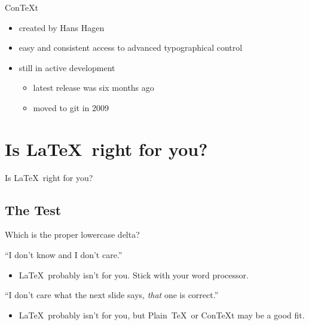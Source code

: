 \documentclass{beamer}                  %
\newcommand{\srule}{
	\rule{\textwidth}{1pt}\\
}
\newlength{\subsecwidth}
\newenvironment{slide}{
	\begin{frame} %
	\settowidth{\subsecwidth}{\insertsubsection} %
	\ifthenelse{\dimtest{\subsecwidth}{<}{1pt}}{ %
		\frametitle{\insertsection\\             %
		\vspace{-1ex}                            %
		\color{fore}\srule                       %
		\par                                     %
		\vspace{-3ex}                            %
		}
	}{                                           %
		\frametitle{\insertsection\ -- \insertsubsection\\ %
		\vspace{-1ex}                            %
		\color{fore}\srule                       %
		\par                                     %
		\vspace{-3ex}                            %
		}
	}
	\Large                                       %
}{
	\end{frame}
}
\newcommand{\titleslide}[1]{
	\section{#1}             %
	\begin{slide}
		\begin{center}
			\color{comments}
			\Huge            %
			#1               %
		\end{center}
	\end{slide}
}
\begin{document}
\begin{slide}
	Con\TeX t
	\begin{itemize}
		\item created by Hans Hagen
		\item easy and consistent access to advanced typographical control
		\item still in active development
		\begin{itemize}
			\item latest release was six months ago
			\item moved to git in 2009
		\end{itemize}
	\end{itemize}
\end{slide}


\titleslide{Is \LaTeX\ right for you?}

\subsection{The Test} %

\begin{slide}
	\begin{center}
		Which is the proper lowercase delta?\\
		\vspace{1em}
		\hspace{2cm}
	\end{center}
\end{slide}

\begin{slide}
	``I don't know and I don't care.''
	\begin{itemize}
		\item<2-> \LaTeX\ probably isn't for you.  Stick with your word
		processor.
	\end{itemize}
\end{slide}

\begin{slide}
	``I don't care what the next slide says, \textit{that} one is correct.''
	\begin{itemize}
		\item<2-> \LaTeX\ probably isn't for you, but Plain~\TeX\ or Con\TeX t
		may be a good fit.
	\end{itemize}
\end{slide}
\end{document}
